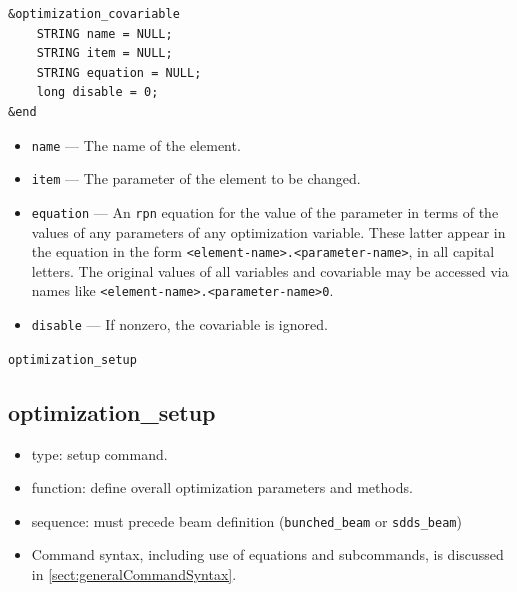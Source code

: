 \documentclass[11pt]{article}
\begin{document}
\begin{verbatim}
&optimization_covariable
    STRING name = NULL;
    STRING item = NULL;
    STRING equation = NULL;
    long disable = 0;
&end
\end{verbatim}

\begin{itemize}
\item \verb|name| --- The name of the element.
\item \verb|item| --- The parameter of the element to be changed.
\item \verb|equation| --- An {\tt rpn} equation for the value of the parameter in terms of the
values of any parameters of any optimization variable.  These latter appear in the equation in the
form \verb|<element-name>.<parameter-name>|, in all capital letters.  The original values of all
variables and covariable may be accessed via names like \verb|<element-name>.<parameter-name>0|.
\item \verb|disable| --- If nonzero, the covariable is ignored.
\end{itemize}

\newpage
\begin{center}{\Large\verb|optimization_setup|}\end{center}
\subsection{optimization\_setup \label{subsec:optimizationsetup}}

\begin{itemize}
\item type: setup command.
\item function: define overall optimization parameters and methods.
\item sequence: must precede beam definition (\verb|bunched_beam| or \verb|sdds_beam|)
\item Command syntax, including use of equations and subcommands, is discussed in \ref{sect:generalCommandSyntax}.
\end{itemize}
\end{document}
